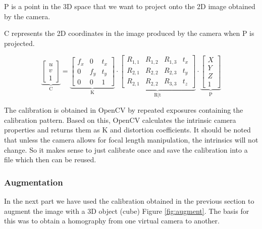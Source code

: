P is a point in the 3D space that we want to project onto the 2D image obtained by the camera. 

C represents the 2D coordinates in the image produced by the camera when P is projected.

\begin{equation}
	\underbrace{
		\begin{bmatrix}
			u \\
			v \\
			1
		\end{bmatrix}
	}_\text{C}
	=
	\underbrace{
		\begin{bmatrix}
			f_{x} & 0 & t_{x} \\
			0 & f_{y} & t_{y} \\
			0 & 0 & 1
		\end{bmatrix}
	}_\text{K}
	\cdot
	\underbrace{
		\begin{bmatrix}
			R_{1,1} & R_{1,2} & R_{1,3} & t_{x} \\
			R_{2,1} & R_{2,2} & R_{2,3} & t_{y} \\
			R_{2,1} & R_{2,2} & R_{3,3} & t_{z}
		\end{bmatrix}
	}_\text{R|t}
	\cdot
	\underbrace{
		\begin{bmatrix}
			X \\
			Y \\
			Z \\
			1
		\end{bmatrix}
	}_\text{P}
	\label{eq:cameramatrix}
\end{equation}

The calibration is obtained in OpenCV by repeated exposures containing the calibration pattern. Based on this, OpenCV calculates the intrinsic camera properties and returns them as K and distortion coefficients. It should be noted that unless the camera allows for focal length manipulation, the intrinsics will not change. So it makes sense to just calibrate once and save the calibration into a file which then can be reused.

\subsubsection{Augmentation}

In the next part we have used the calibration obtained in the previous section to augment the image with a 3D object (cube) Figure \ref{fig:augment}. The basis for this was to obtain a homography from one virtual camera to another. 

